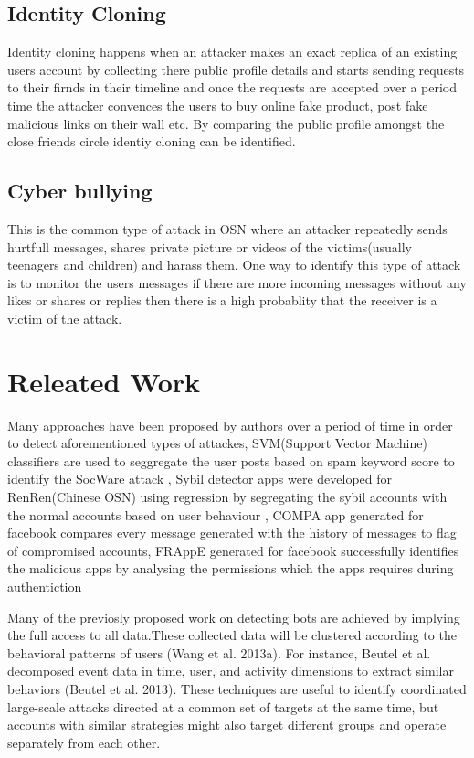\documentclass[conference]{IEEEtran}
\begin{document}
\subsection{Identity Cloning}
Identity cloning happens when an attacker makes an exact replica of an existing users account by collecting there public profile details and starts sending requests to their firnds in their timeline and once the requests are accepted over a period time the attacker convences the users to buy online fake product, post fake malicious links on their wall etc.
By comparing the public profile amongst the close friends circle identiy cloning can be identified.

\subsection{Cyber bullying}
This is the common type of attack in OSN where an attacker repeatedly sends hurtfull messages, shares private picture or videos of the victims(usually teenagers and children) and harass them. One way to identify this type of attack is to monitor the users messages if there are more incoming messages without any likes or shares or replies then there is a high probablity that the receiver is a victim of the attack.

\section{Releated Work}
Many approaches have been proposed by authors over a period of time in order to detect aforementioned types of attackes, SVM(Support Vector Machine) classifiers are used to seggregate the user posts based on spam keyword score to identify the SocWare attack \cite{DUMMY:1}, Sybil detector apps were developed for RenRen(Chinese OSN) using regression by segregating the sybil accounts with the normal accounts based on user behaviour \cite{DUMMY:2}, \cite{DUMMY:3} COMPA app generated for facebook compares every message generated with the history of messages to flag of compromised accounts, FRAppE generated for facebook successfully identifies the malicious apps by analysing the permissions which the apps requires during authentiction \cite{DUMMY:4}


Many of the previosly proposed work on detecting bots are achieved by implying the full access to all data.These collected data will be clustered according to the behavioral patterns of users (Wang et al. 2013a). For instance, Beutel et al. decomposed event data in time, user, and activity dimensions to extract similar behaviors (Beutel et al. 2013). These techniques are useful to identify coordinated large-scale attacks directed at a common set of targets at the same time, but accounts with similar strategies might also target different groups and operate separately from each other.
\end{document}
